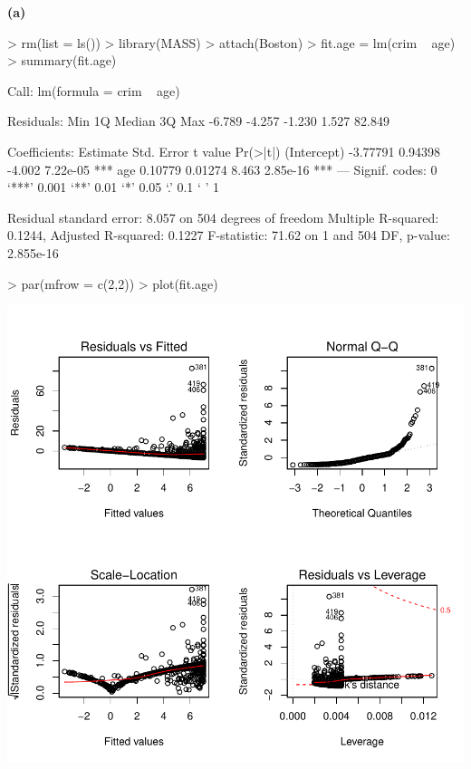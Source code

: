\documentclass[a4paper]{article}
\renewcommand{\part}[1] {\vspace{.10in} {\bf (#1)}}
\begin{document}
\part{a}
\begin{Schunk}
\begin{Sinput}
> rm(list = ls())
> library(MASS)
> attach(Boston)
> fit.age = lm(crim ~ age)
> summary(fit.age)
\end{Sinput}
\begin{Soutput}
Call:
lm(formula = crim ~ age)

Residuals:
   Min     1Q Median     3Q    Max 
-6.789 -4.257 -1.230  1.527 82.849 

Coefficients:
            Estimate Std. Error t value Pr(>|t|)    
(Intercept) -3.77791    0.94398  -4.002 7.22e-05 ***
age          0.10779    0.01274   8.463 2.85e-16 ***
---
Signif. codes:  0 ‘***’ 0.001 ‘**’ 0.01 ‘*’ 0.05 ‘.’ 0.1 ‘ ’ 1

Residual standard error: 8.057 on 504 degrees of freedom
Multiple R-squared:  0.1244,	Adjusted R-squared:  0.1227 
F-statistic: 71.62 on 1 and 504 DF,  p-value: 2.855e-16
\end{Soutput}
\begin{Sinput}
> par(mfrow = c(2,2))
> plot(fit.age)
\end{Sinput}
\end{Schunk}
\includegraphics{mutivariblelm-age}
\end{document}
